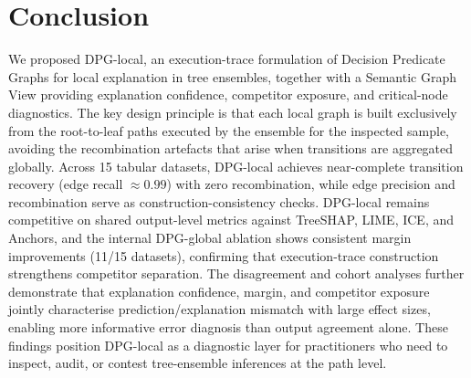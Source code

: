 \documentclass[runningheads]{llncs}
\begin{document}
\section{Conclusion}

We proposed DPG-local, an execution-trace formulation of Decision Predicate Graphs for local explanation in tree ensembles, together with a Semantic Graph View providing explanation confidence, competitor exposure, and critical-node diagnostics. The key design principle is that each local graph is built exclusively from the root-to-leaf paths executed by the ensemble for the inspected sample, avoiding the recombination artefacts that arise when transitions are aggregated globally.
Across 15 tabular datasets, DPG-local achieves near-complete transition recovery (edge recall $\approx0.99$) with zero recombination, while edge precision and recombination serve as construction-consistency checks. DPG-local remains competitive on shared output-level metrics against TreeSHAP, LIME, ICE, and Anchors, and the internal DPG-global ablation shows consistent margin improvements (11/15 datasets), confirming that execution-trace construction strengthens competitor separation. The disagreement and cohort analyses further demonstrate that explanation confidence, margin, and competitor exposure jointly characterise prediction/explanation mismatch with large effect sizes, enabling more informative error diagnosis than output agreement alone. These findings position DPG-local as a diagnostic layer for practitioners who need to inspect, audit, or contest tree-ensemble inferences at the path level.



\end{document}
